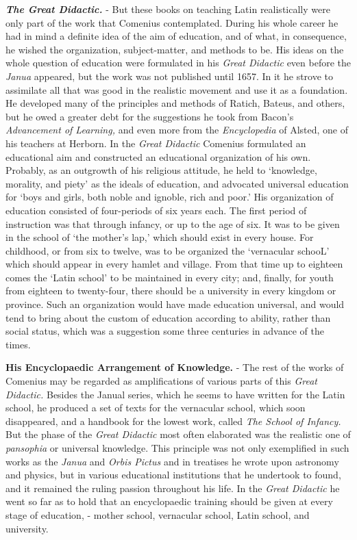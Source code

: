 \documentclass[
]{book}
\begin{document}
\textbf{\emph{The Great Didactic.}} - But these books on teaching Latin realistically were only part of the work that Comenius contemplated. During his whole career he had in mind a definite idea of the aim of education, and of what, in consequence, he wished the organization, subject-matter, and methods to be. His ideas on the whole question of education were formulated in his \emph{Great Didactic} even before the \emph{Janua} appeared, but the work was not published until 1657. In it he strove to assimilate all that was good in the realistic movement and use it as a foundation. He developed many of the principles and methods of Ratich, Bateus, and others, but he owed a greater debt for the suggestions he took from Bacon's \emph{Advancement of Learning,} and even more from the \emph{Encyclopedia} of Alsted, one of his teachers at Herborn. In the \emph{Great Didactic} Comenius formulated an educational aim and constructed an educational organization of his own. Probably, as an outgrowth of his religious attitude, he held to `knowledge, morality, and piety' as the ideals of education, and advocated universal education for `boys and girls, both noble and ignoble, rich and poor.' His organization of education consisted of four-periods of six years each. The first period of instruction was that through infancy, or up to the age of six. It was to be given in the school of `the mother's lap,' which should exist in every house. For childhood, or from six to twelve, was to be organized the `vernacular schooL' which should appear in every hamlet and village. From that time up to eighteen comes the `Latin school' to be maintained in every city; and, finally, for youth from eighteen to twenty-four, there should be a university in every kingdom or province. Such an organization would have made education universal, and would tend to bring about the custom of education according to ability, rather than social status, which was a suggestion some three centuries in advance of the times.

\textbf{His Encyclopaedic Arrangement of Knowledge.} - The rest of the works of Comenius may be regarded as amplifications of various parts of this \emph{Great Didactic.} Besides the Janual series, which he seems to have written for the Latin school, he produced a set of texts for the vernacular school, which soon disappeared, and a handbook for the lowest work, called \emph{The School of Infancy.} But the phase of the \emph{Great Didactic} most often elaborated was the realistic one of \emph{pansophia} or universal knowledge. This principle was not only exemplified in such works as the \emph{Janua} and \emph{Orbis Pictus} and in treatises he wrote upon astronomy and physics, but in various educational institutions that he undertook to found, and it remained the ruling passion throughout his life. In the \emph{Great Didactic} he went so far as to hold that an encyclopaedic training should be given at every stage of education, - mother school, vernacular school, Latin school, and university.
\end{document}
